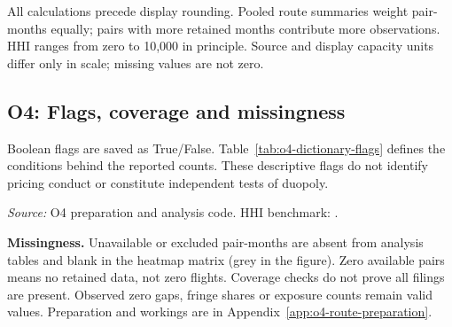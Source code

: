 \documentclass[12pt,a4paper]{article}
\begin{document}
All calculations precede display rounding. Pooled route summaries weight pair-months equally; pairs with more retained months contribute more observations. HHI ranges from zero to 10,000 in principle. Source and display capacity units differ only in scale; missing values are not zero.

\clearpage
\subsection{O4: Flags, coverage and missingness}
\label{app:o4-flags}
Boolean flags are saved as True/False. Table~\ref{tab:o4-dictionary-flags} defines the conditions behind the reported counts. These descriptive flags do not identify pricing conduct or constitute independent tests of duopoly.

\begin{minipage}{\linewidth}
\captionsetup{font=small,labelfont=bf,justification=raggedright,singlelinecheck=false,hypcap=false}
\label{tab:o4-dictionary-flags}
\centering
{\footnotesize{}\setlength{\tabcolsep}{4pt}\par}
\vspace{4pt}
{\footnotesize{}\raggedright\textit{Source:} O4 preparation and analysis code. HHI benchmark: \textcite[Section~2.1]{dojftc2023merger}.\par}
\end{minipage}

\textbf{Missingness.} Unavailable or excluded pair-months are absent from analysis tables and blank in the heatmap matrix (grey in the figure). Zero available pairs means no retained data, not zero flights. Coverage checks do not prove all filings are present. Observed zero gaps, fringe shares or exposure counts remain valid values. Preparation and workings are in Appendix~\ref{app:o4-route-preparation}.

\clearpage
\end{document}
